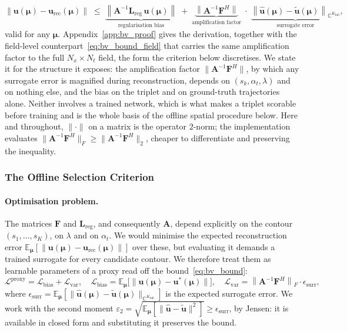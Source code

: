 ﻿\documentclass[a4paper,12pt]{article}
\theoremstyle{definition}
\theoremstyle{remark}
\newcommand{\C}{\mathbb{C}}
\newcommand{\vmu}{\bm{\mu}}
\begin{document}
\begin{equation}
\label{eq:bv_bound}
    \left\|\bm{u}(\vmu) - \bm{u}_{\mathrm{rec}}(\vmu)\right\|
    \;\leq\;
    \underbrace{\left\|\bm{A}^{-1}\bm{L}_{\mathrm{reg}}\,\bm{u}(\vmu)\right\|}_{\text{regularisation bias}}
    \;+\;
    \underbrace{\left\|\bm{A}^{-1}\bm{F}^H\right\|}_{\text{amplification factor}}
    \;\cdot\;
    \underbrace{\left\|\hat{\bm{u}}(\vmu) - \tilde{\bm{u}}(\vmu)\right\|_{\C^{K_{\mathrm{full}}}}}_{\text{surrogate error}},
\end{equation}
valid for any $\vmu$. Appendix~\ref{app:bv_proof} gives the derivation, together with the field-level counterpart~\eqref{eq:bv_bound_field} that carries the same amplification factor to the full $N_x \times N_t$ field, the form the criterion below discretises. We state it for the structure it exposes: the amplification factor $\|\bm{A}^{-1}\bm{F}^H\|$, by which any surrogate error is magnified during reconstruction, depends on $(s_k, \alpha_t, \lambda)$ and on nothing else, and the bias on the triplet and on ground-truth trajectories alone. Neither involves a trained network, which is what makes a triplet scorable before training and is the whole basis of the offline spatial procedure below. Here and throughout, $\|\cdot\|$ on a matrix is the operator $2$-norm; the implementation evaluates $\|\bm{A}^{-1}\bm{F}^H\|_F \ge \|\bm{A}^{-1}\bm{F}^H\|_2$, cheaper to differentiate and preserving the inequality.

\subsubsection{The Offline Selection Criterion}

\paragraph{Optimisation problem.}
The matrices $\bm{F}$ and $\bm{L}_{\mathrm{reg}}$, and consequently $\bm{A}$, depend explicitly on the contour $(s_1,\dots,s_K)$, on $\lambda$ and on $\alpha_t$. We would minimise the expected reconstruction error $\mathbb{E}_{\vmu}[\|\bm{u}(\vmu) - \bm{u}_{\mathrm{rec}}(\vmu)\|]$ over these, but evaluating it demands a trained surrogate for every candidate contour. We therefore treat them as learnable parameters of a proxy read off the bound~\eqref{eq:bv_bound}:
\begin{equation}
    \mathcal{L}^{\mathrm{proxy}} = \mathcal{L}_{\mathrm{bias}} + \mathcal{L}_{\mathrm{var}},
    \quad
    \mathcal{L}_{\mathrm{bias}} = \mathbb{E}_{\vmu}\bigl[\|\bm{u}(\vmu) - \bm{u}^*(\vmu)\|\bigr],
    \quad
    \mathcal{L}_{\mathrm{var}} = \left\|\bm{A}^{-1}\bm{F}^H\right\|_F \cdot \epsilon_{\mathrm{surr}},
\end{equation}
where $\epsilon_{\mathrm{surr}} = \mathbb{E}_{\vmu}[\|\hat{\bm{u}}(\vmu) - \tilde{\bm{u}}(\vmu)\|_{\C^{K_{\mathrm{full}}}}]$ is the expected surrogate error. We work with the second moment $\varepsilon_2 = \sqrt{\mathbb{E}_{\vmu}[\|\hat{\bm{u}} - \tilde{\bm{u}}\|^2]} \ge \epsilon_{\mathrm{surr}}$, by Jensen: it is available in closed form and substituting it preserves the bound.
\end{document}
